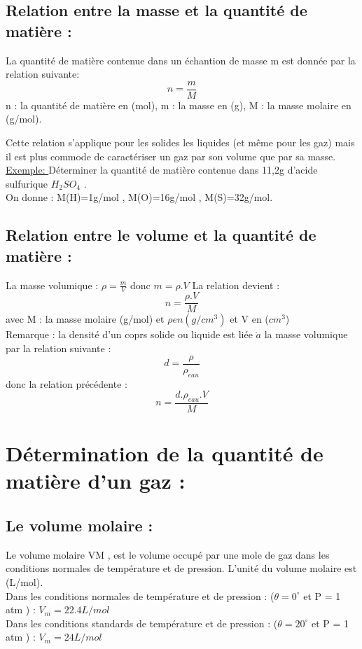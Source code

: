 \documentclass[12pt]{article}
\begin{document}
    \subsection{Relation entre la masse et la quantité de matière : }
    La quantité de matière contenue dans un échantion de masse m est donnée par la relation suivante: $$n = \frac{m}{M}$$
    n : la quantité de matière en (mol), \hspace{1cm} m : la masse en (g), \hspace{1cm} M : la masse molaire en (g/mol).

    Cette relation s'applique pour les solides les liquides (et même pour les gaz) mais il est plus commode de caractériser un gaz par son volume que par sa masse.\\
\underline{Exemple: }Déterminer la quantité de matière contenue dans 11,2g d'acide sulfurique $H_2SO_4$ .
\\On donne : M(H)=1g/mol , M(O)=16g/mol , M(S)=32g/mol.

\subsection{Relation entre le volume et la quantité de matière :}
La masse volumique : $\rho = \frac{m}{V}$ donc $m = \rho.V$ La relation devient : $$ n = \frac{\rho.V}{M}$$ avec M : la masse molaire (g/mol) et $\rho en (g/cm^3)$ et V en ($cm^3$)
\\Remarque : la densité d'un coprs solide ou liquide est liée $\grave{a}$ la masse volumique par la relation suivante : $$d = \frac{\rho}{\rho_{eau}}$$
donc la relation précédente : $$n = \frac{d.\rho_{eau}.V}{M}$$

\section{Détermination de la quantité de matière d'un gaz : }
\subsection{Le volume molaire : }
Le volume molaire VM , est le volume occupé par une mole de gaz dans les conditions normales de température et
de pression.
L'unité du volume molaire est (L/mol).
\\Dans les conditions normales de température et de pression : ($\theta = 0^{\circ}$ et P = 1 atm ) : $V_m = 22.4 L/mol$
\\Dans les conditions standards de température et de pression : ($\theta = 20^{\circ}$ et P = 1 atm ) : $V_m = 24 L/mol$
\end{document}
